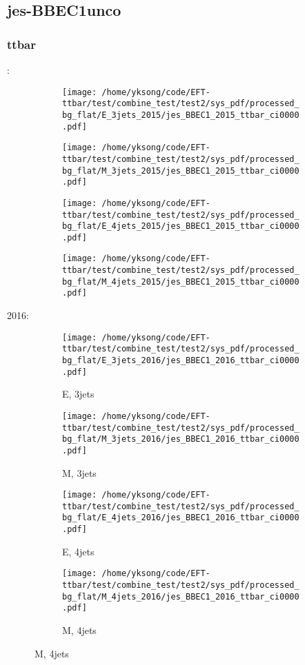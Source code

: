 \documentclass{beamer}
\begin{document}
\subsection{jes-BBEC1unco}

\begin{frame}
\frametitle{ttbar}
\fontsize{5}{1}:
\begin{figure}
\centering
\begin{subfigure}[b]{0.24\textwidth}
\texttt{[image: /home/yksong/code/EFT-ttbar/test/combine\_test/test2/sys\_pdf/processed\_bg\_flat/E\_3jets\_2015/jes\_BBEC1\_2015\_ttbar\_ci0000.pdf]}
\end{subfigure}
\begin{subfigure}[b]{0.24\textwidth}
\texttt{[image: /home/yksong/code/EFT-ttbar/test/combine\_test/test2/sys\_pdf/processed\_bg\_flat/M\_3jets\_2015/jes\_BBEC1\_2015\_ttbar\_ci0000.pdf]}
\end{subfigure}
\begin{subfigure}[b]{0.24\textwidth}
\texttt{[image: /home/yksong/code/EFT-ttbar/test/combine\_test/test2/sys\_pdf/processed\_bg\_flat/E\_4jets\_2015/jes\_BBEC1\_2015\_ttbar\_ci0000.pdf]}
\end{subfigure}
\begin{subfigure}[b]{0.24\textwidth}
\texttt{[image: /home/yksong/code/EFT-ttbar/test/combine\_test/test2/sys\_pdf/processed\_bg\_flat/M\_4jets\_2015/jes\_BBEC1\_2015\_ttbar\_ci0000.pdf]}
\end{subfigure}
\end{figure}
2016:
\begin{figure}
\centering
\begin{subfigure}[b]{0.24\textwidth}
\texttt{[image: /home/yksong/code/EFT-ttbar/test/combine\_test/test2/sys\_pdf/processed\_bg\_flat/E\_3jets\_2016/jes\_BBEC1\_2016\_ttbar\_ci0000.pdf]}
\captionsetup{font=tiny}
\caption{E, 3jets}
\end{subfigure}
\begin{subfigure}[b]{0.24\textwidth}
\texttt{[image: /home/yksong/code/EFT-ttbar/test/combine\_test/test2/sys\_pdf/processed\_bg\_flat/M\_3jets\_2016/jes\_BBEC1\_2016\_ttbar\_ci0000.pdf]}
\captionsetup{font=tiny}
\caption{M, 3jets}
\end{subfigure}
\begin{subfigure}[b]{0.24\textwidth}
\texttt{[image: /home/yksong/code/EFT-ttbar/test/combine\_test/test2/sys\_pdf/processed\_bg\_flat/E\_4jets\_2016/jes\_BBEC1\_2016\_ttbar\_ci0000.pdf]}
\captionsetup{font=tiny}
\caption{E, 4jets}
\end{subfigure}
\begin{subfigure}[b]{0.24\textwidth}
\texttt{[image: /home/yksong/code/EFT-ttbar/test/combine\_test/test2/sys\_pdf/processed\_bg\_flat/M\_4jets\_2016/jes\_BBEC1\_2016\_ttbar\_ci0000.pdf]}
\captionsetup{font=tiny}
\caption{M, 4jets}
\end{subfigure}
\end{figure}
\end{frame}
\end{document}
